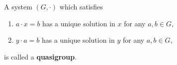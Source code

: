 A system $(G, \cdot)$ which satisfies

\begin{enumerate}
\item[(i)] $a \cdot x = b$ has a unique solution in $x$ for any $a, b \in G$,
\item[(ii)] $y \cdot a = b$ has a unique solution in $y$ for any $a, b \in G$,
\end{enumerate}

is called a \textbf{quasigroup}.

